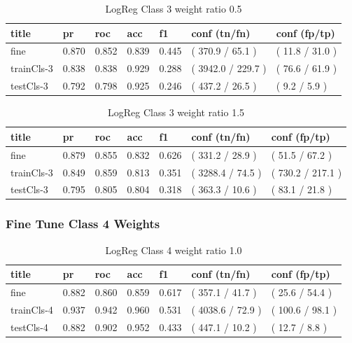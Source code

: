 \documentclass[ms]{nuthesis}
\begin{document}
\FloatBarrier
\begin{table}[H]
\centering
\begin{tabular}{|l||l||l||l||l||l||l|}\toprule
title & pr & roc & acc & f1 & conf (tn/fn) & conf (fp/tp) \\ \midrule
fine & 0.870 & 0.852 & 0.839 & 0.445 & ( 370.9 / 65.1 ) & ( 11.8 / 31.0 ) \\
trainCls-3 & 0.838 & 0.838 & 0.929 & 0.288 & ( 3942.0 / 229.7 ) & ( 76.6 / 61.9 ) \\
testCls-3 & 0.792 & 0.798 & 0.925 & 0.246 & ( 437.2 / 26.5 ) & ( 9.2 / 5.9 ) \\ \bottomrule
\end{tabular}
\caption{LogReg Class 3 weight ratio 0.5}
\label{tab:LogRegCls3-Wtp5}
\end{table}
\FloatBarrier

\FloatBarrier
\begin{table}[H]
\centering
\begin{tabular}{|l||l||l||l||l||l||l|}\toprule
title & pr & roc & acc & f1 & conf (tn/fn) & conf (fp/tp) \\ \midrule
fine & 0.879 & 0.855 & 0.832 & 0.626 & ( 331.2 / 28.9 ) & ( 51.5 / 67.2 ) \\
trainCls-3 & 0.849 & 0.859 & 0.813 & 0.351 & ( 3288.4 / 74.5 ) & ( 730.2 / 217.1 ) \\
testCls-3 & 0.795 & 0.805 & 0.804 & 0.318 & ( 363.3 / 10.6 ) & ( 83.1 / 21.8 ) \\ \bottomrule
\end{tabular}
\caption{LogReg Class 3 weight ratio 1.5}
\label{tab:LogRegCls3-Wt1p5}
\end{table}
\FloatBarrier


\subsubsection{Fine Tune Class 4 Weights}
\FloatBarrier
\begin{table}[H]
\centering
\begin{tabular}{|l||l||l||l||l||l||l|}\toprule
title & pr & roc & acc & f1 & conf (tn/fn) & conf (fp/tp) \\ \midrule
fine & 0.882 & 0.860 & 0.859 & 0.617 & ( 357.1 / 41.7 ) & ( 25.6 / 54.4 ) \\
trainCls-4 & 0.937 & 0.942 & 0.960 & 0.531 & ( 4038.6 / 72.9 ) & ( 100.6 / 98.1 ) \\
testCls-4 & 0.882 & 0.902 & 0.952 & 0.433 & ( 447.1 / 10.2 ) & ( 12.7 / 8.8 ) \\ \bottomrule
\end{tabular}
\caption{LogReg Class 4 weight ratio 1.0}
\label{tab:LogRegCls4-Wt1}
\end{table}
\FloatBarrier
\end{document}
